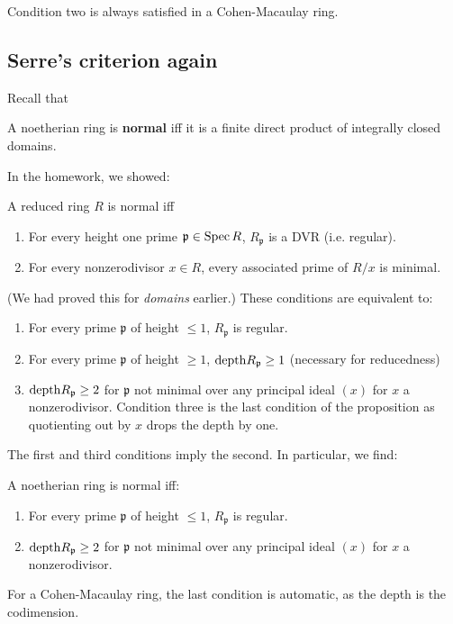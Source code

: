 Condition two is always satisfied in a Cohen-Macaulay ring. 

\subsection{Serre's criterion again}

Recall that
\begin{definition} 
A noetherian ring is \textbf{normal} iff it is a finite direct
product of
integrally closed domains.
\end{definition} 

In the homework, we showed:
\begin{proposition} 
A reduced ring $R$ is normal iff 
\begin{enumerate}
\item For every height one prime $\mathfrak{p}  \in \operatorname{Spec} R$,
$R_{\mathfrak{p}}$ is a DVR (i.e. regular).
\item For every nonzerodivisor $x \in R$, every associated prime
of $R/x$ is
minimal.
\end{enumerate}
\end{proposition} 
(We had proved this for \emph{domains} earlier.)
These conditions are equivalent to:
\begin{enumerate}
\item For every prime $\mathfrak{p}$ of height $\leq 1$,
$R_{\mathfrak{p}} $ is regular.
\item For every prime $\mathfrak{p}$ of height $\geq 1$,
$\mathrm{depth} R_{\mathfrak{p}} \geq 1$ (necessary for reducedness)
\item $\mathrm{depth} R_{\mathfrak{p}} \geq 2$ for $\mathfrak{p}$ not
minimal over any
principal ideal $(x)$ for $x$ a nonzerodivisor. Condition three
is the last
condition of the proposition as quotienting out by $x$ drops the
depth by one.
\end{enumerate}

The first and third conditions imply the second. In particular,
we find:

\begin{theorem} A noetherian ring is normal
iff:
\begin{enumerate}
\item For every prime $\mathfrak{p}$ of height $\leq 1$,
$R_{\mathfrak{p}} $ is regular.
\item $\mathrm{depth} R_{\mathfrak{p}} \geq 2$ for $\mathfrak{p}$ not
minimal over any
principal ideal $(x)$ for $x$ a nonzerodivisor. \end{enumerate}
\end{theorem} 
For a Cohen-Macaulay ring, the last condition is automatic, as
the depth is the
codimension.

